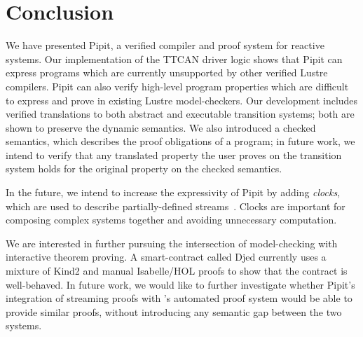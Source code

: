 
\section{Conclusion}

We have presented Pipit, a verified compiler and proof system for reactive systems.
Our implementation of the TTCAN driver logic shows that Pipit can express programs which are currently unsupported by other verified Lustre compilers.
Pipit can also verify high-level program properties which are difficult to express and prove in existing Lustre model-checkers.
Our development includes verified translations to both abstract and executable transition systems; both are shown to preserve the dynamic semantics.
We also introduced a checked semantics, which describes the proof obligations of a program; in future work, we intend to verify that any translated property the user proves on the transition system holds for the original property on the checked semantics.

In the future, we intend to increase the expressivity of Pipit by adding \emph{clocks}, which are used to describe partially-defined streams~\cite{caspi1995functional}.
Clocks are important for composing complex systems together and avoiding unnecessary computation.

We are interested in further pursuing the intersection of model-checking with interactive theorem proving.
A smart-contract called Djed \cite{zahnentferner2023djed} currently uses a mixture of Kind2 \cite{champion2016kind2} and manual Isabelle/HOL proofs to show that the contract is well-behaved.
In future work, we would like to further investigate whether Pipit's integration of streaming proofs with \fstar{}'s automated proof system would be able to provide similar proofs, without introducing any semantic gap between the two systems.
